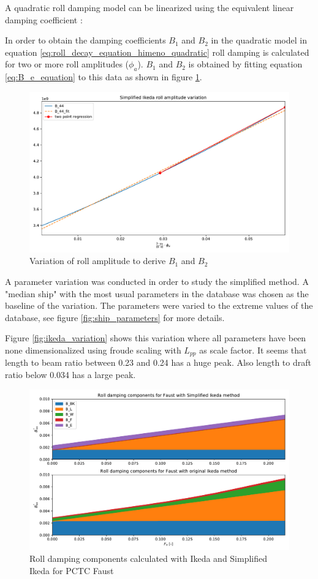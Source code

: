 A quadratic roll damping model can be linearized using the equivalent linear damping coefficient \cite{himeno_prediction_1981}:

In order to obtain the damping coefficients $B_1$ and $B_2$ in the quadratic model in equation \ref{eq:roll_decay_equation_himeno_quadratic} roll damping is calculated for two or more roll amplitudes ($\phi_a$). $B_1$ and $B_2$ is obtained by fitting equation \ref{eq:B_e_equation} to this data as shown in figure \ref{fig:ikeda_B_1_B2}.  

\begin{figure}[H]
    \centering
    \includegraphics[width=\columnwidth]{figures/ikeda_B_1_B_2.pdf}
    \caption{Variation of roll amplitude to derive $B_1$ and $B_2$}
    \label{fig:ikeda_B_1_B2}
\end{figure}

A parameter variation was conducted in order to study the simplified method.
A "median ship" with the most usual parameters in the database was chosen as the baseline of the variation. The parameters were varied to the extreme values of the database, see figure \ref{fig:ship_parameters} for more details. 

Figure \ref{fig:ikeda_variation} shows this variation where all parameters have been none dimensionalized using froude scaling with $L_{pp}$ as scale factor. 
It seems that length to beam ratio between 0.23 and 0.24 has a huge peak. Also length to draft ratio below 0.034 has a large peak. 



\begin{figure}[h]
    \centering
    \includegraphics[width=\columnwidth]{figures/ikeda_vs_simplified.pdf}
    \caption{Roll damping components calculated with Ikeda and Simplified Ikeda for PCTC Faust}
    \label{fig:ikeda_vs_simplified}
\end{figure}







